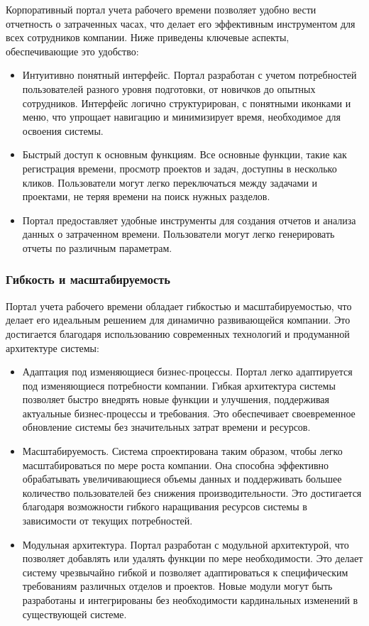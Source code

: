 Корпоративный портал учета рабочего времени позволяет удобно вести отчетность о затраченных часах, что делает его эффективным инструментом для всех сотрудников компании. Ниже приведены ключевые аспекты, обеспечивающие это удобство:

\begin{itemize}
\item Интуитивно понятный интерфейс. Портал разработан с учетом потребностей пользователей разного уровня подготовки, от новичков до опытных сотрудников. Интерфейс логично структурирован, с понятными иконками и меню, что упрощает навигацию и минимизирует время, необходимое для освоения системы.

\item Быстрый доступ к основным функциям. Все основные функции, такие как регистрация времени, просмотр проектов и задач, доступны в несколько кликов. Пользователи могут легко переключаться между задачами и проектами, не теряя времени на поиск нужных разделов.

\item Портал предоставляет удобные инструменты для создания отчетов и анализа данных о затраченном времени. Пользователи могут легко генерировать отчеты по различным параметрам.
\end{itemize}


\subsubsection{Гибкость и масштабируемость}

Портал учета рабочего времени обладает гибкостью и масштабируемостью, что делает его идеальным решением для динамично развивающейся компании. Это достигается благодаря использованию современных технологий и продуманной архитектуре системы:

\begin{itemize}
\item Адаптация под изменяющиеся бизнес-процессы. Портал легко адаптируется под изменяющиеся потребности компании. Гибкая архитектура системы позволяет быстро внедрять новые функции и улучшения, поддерживая актуальные бизнес-процессы и требования. Это обеспечивает своевременное обновление системы без значительных затрат времени и ресурсов.

\item Масштабируемость. Система спроектирована таким образом, чтобы легко масштабироваться по мере роста компании. Она способна эффективно обрабатывать увеличивающиеся объемы данных и поддерживать большее количество пользователей без снижения производительности. Это достигается благодаря возможности гибкого наращивания ресурсов системы в зависимости от текущих потребностей.

\item Модульная архитектура. Портал разработан с модульной архитектурой, что позволяет добавлять или удалять функции по мере необходимости. Это делает систему чрезвычайно гибкой и позволяет адаптироваться к специфическим требованиям различных отделов и проектов. Новые модули могут быть разработаны и интегрированы без необходимости кардинальных изменений в существующей системе.
\end{itemize}

